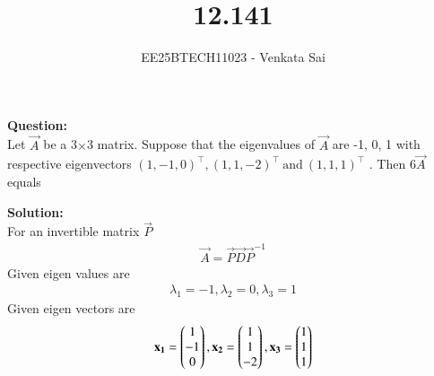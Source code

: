 \documentclass[journal]{IEEEtran}
\begin{document}


\title{12.141}
\author{EE25BTECH11023 - Venkata Sai}
\maketitle 
\renewcommand{\thefigure}{\theenumi}
\renewcommand{\thetable}{\theenumi}
\setlength{\intextsep}{10pt} %

\renewcommand{\thetable}{\theenumi}

\textbf{Question:}  \\
Let $\vec{A}$ be a 3$\times$3 matrix. Suppose that the eigenvalues of $\vec{A}$ are -1, 0, 1 with respective
eigenvectors $(1, -1, 0)^\top , (1, 1, -2)^\top\ \text{and}\ (1, 1, 1)^\top$ . Then 6$\vec{A}$ equals 
\begin{enumerate}
\begin{multicols}{4}
    \item {}
    \item {}
    \item {}
\item {}
\end{multicols}
\end{enumerate}
\textbf{Solution:}  \\
 For an invertible matrix $\vec{P}$
 \begin{align}
     \vec{A}=\vec{P}\vec{D}\vec{P}^{-1}
 \end{align}
 Given eigen values are
 \begin{align}
    \lambda_1=-1,\lambda_2=0,\lambda_3=1
 \end{align}
 Given eigen vectors are
 \begin{align}
\mathbf{x_1}=\begin{pmatrix}1\\-1\\0\end{pmatrix},\mathbf{x_2}=\begin{pmatrix}1\\1\\-2\end{pmatrix},\mathbf{x_3}=\begin{pmatrix}1\\1\\1\end{pmatrix}
 \end{align}
\end{document}
